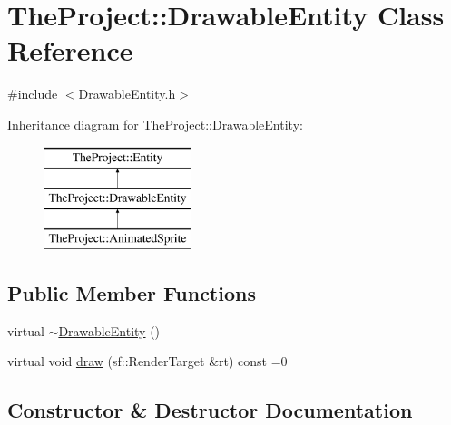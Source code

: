 \hypertarget{class_the_project_1_1_drawable_entity}{}\section{The\+Project\+:\+:Drawable\+Entity Class Reference}
\label{class_the_project_1_1_drawable_entity}


{\ttfamily \#include $<$Drawable\+Entity.\+h$>$}

Inheritance diagram for The\+Project\+:\+:Drawable\+Entity\+:\begin{figure}[H]
\begin{center}
\leavevmode
\includegraphics[height=3.000000cm]{class_the_project_1_1_drawable_entity}
\end{center}
\end{figure}
\subsection*{Public Member Functions}
\begin{DoxyCompactItemize}
\item 
virtual \mbox{\hyperlink{class_the_project_1_1_drawable_entity_a93f6204fae258f53e78d699837b1038f}{$\sim$\+Drawable\+Entity}} ()
\item 
virtual void \mbox{\hyperlink{class_the_project_1_1_drawable_entity_adeb42d834f561a06b268d22f3fd354ef}{draw}} (sf\+::\+Render\+Target \&rt) const =0
\end{DoxyCompactItemize}


\subsection{Constructor \& Destructor Documentation}
\mbox{\label{class_the_project_1_1_drawable_entity_a93f6204fae258f53e78d699837b1038f}} 
